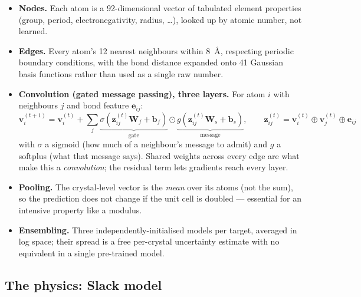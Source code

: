 \documentclass[11pt,a4paper]{article}
\begin{document}
\begin{itemize}\setlength{\itemsep}{2pt}
\item \textbf{Nodes.} Each atom is a 92-dimensional vector of tabulated
  element properties (group, period, electronegativity, radius, \ldots),
  looked up by atomic number, not learned.
\item \textbf{Edges.} Every atom's 12 nearest neighbours within 8~\AA{},
  respecting periodic boundary conditions, with the bond distance expanded
  onto 41 Gaussian basis functions rather than used as a single raw number.
\item \textbf{Convolution (gated message passing), three layers.} For atom
  $i$ with neighbours $j$ and bond feature $\mathbf{e}_{ij}$:
  \begin{equation}
    \mathbf{v}_i^{(t+1)} = \mathbf{v}_i^{(t)} + \sum_{j}
      \underbrace{\sigma(\mathbf{z}_{ij}^{(t)}\mathbf{W}_f + \mathbf{b}_f)}_{\text{gate}}
      \odot
      \underbrace{g(\mathbf{z}_{ij}^{(t)}\mathbf{W}_s + \mathbf{b}_s)}_{\text{message}},
    \qquad \mathbf{z}_{ij}^{(t)} = \mathbf{v}_i^{(t)} \oplus \mathbf{v}_j^{(t)} \oplus \mathbf{e}_{ij}
  \end{equation}
  with $\sigma$ a sigmoid (how much of a neighbour's message to admit) and
  $g$ a softplus (what that message says). Shared weights across every edge
  are what make this a \emph{convolution}; the residual term lets gradients
  reach every layer.
\item \textbf{Pooling.} The crystal-level vector is the \emph{mean} over its
  atoms (not the sum), so the prediction does not change if the unit cell is
  doubled --- essential for an intensive property like a modulus.
\item \textbf{Ensembling.} Three independently-initialised models per
  target, averaged in log space; their spread is a free per-crystal
  uncertainty estimate with no equivalent in a single pre-trained model.
\end{itemize}

\subsection{The physics: Slack model}
\end{document}
